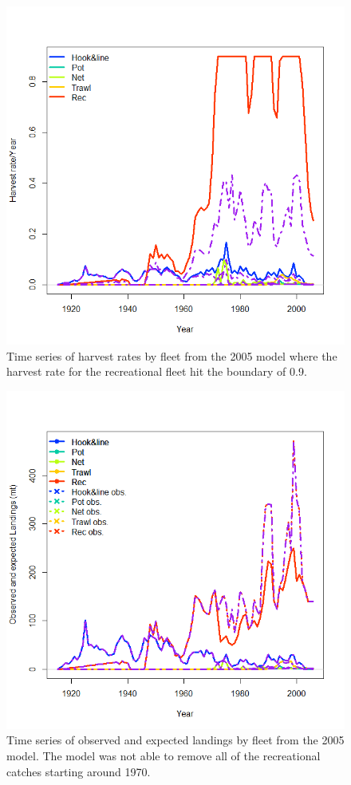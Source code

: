 \documentclass[12pt,]{article}
\begin{document}
\FloatBarrier

\begin{figure}[htbp]
\centering
\includegraphics{Figures/bridge_harvestrate.png}
\caption{Time series of harvest rates by fleet from the 2005 model where
the harvest rate for the recreational fleet hit the boundary of 0.9.
\label{fig:bridge_harvestrate}}
\end{figure}

\begin{figure}[htbp]
\centering
\includegraphics{Figures/bridge_catch.png}
\caption{Time series of observed and expected landings by fleet from the
2005 model. The model was not able to remove all of the recreational
catches starting around 1970. \label{fig:bridge_catch}}
\end{figure}
\end{document}
